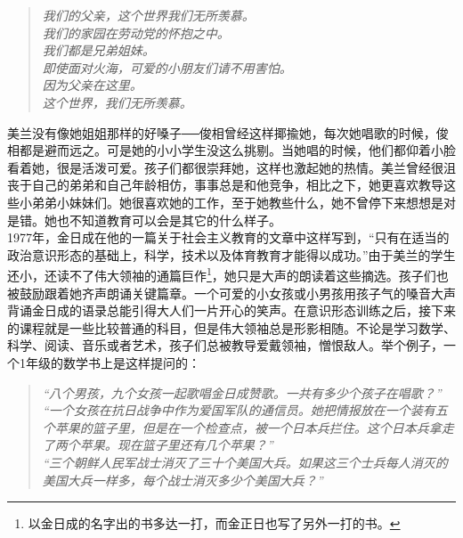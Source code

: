 \begin{quote}
	\begin{spacing}{1.0}  %
		\textit{{\footnotesize 	我们的父亲，这个世界我们无所羡慕。\\
		我们的家园在劳动党的怀抱之中。\\
		我们都是兄弟姐妹。\\
		即使面对火海，可爱的小朋友们请不用害怕。\\
		因为父亲在这里。\\
		这个世界，我们无所羡慕。\\}}
	\end{spacing}
\end{quote}

美兰没有像她姐姐那样的好嗓子──俊相曾经这样揶揄她，每次她唱歌的时候，俊相都是避而远之。可是她的小小学生没这么挑剔。当她唱的时候，他们都仰着小脸看着她，很是活泼可爱。孩子们都很崇拜她，这样也激起她的热情。美兰曾经很沮丧于自己的弟弟和自己年龄相仿，事事总是和他竞争，相比之下，她更喜欢教导这些小弟弟小妹妹们。她很喜欢她的工作，至于她教些什么，她不曾停下来想想是对是错。她也不知道教育可以会是其它的什么样子。\\

1977年，金日成在他的一篇关于社会主义教育的文章中这样写到，“只有在适当的政治意识形态的基础上，科学，技术以及体育教育才能得以成功。”由于美兰的学生还小，还读不了伟大领袖的通篇巨作\footnote{以金日成的名字出的书多达一打，而金正日也写了另外一打的书。}，她只是大声的朗读着这些摘选。孩子们也被鼓励跟着她齐声朗诵关键篇章。一个可爱的小女孩或小男孩用孩子气的嗓音大声背诵金日成的语录总能引得大人们一片开心的笑声。在意识形态训练之后，接下来的课程就是一些比较普通的科目，但是伟大领袖总是形影相随。不论是学习数学、科学、阅读、音乐或者艺术，孩子们总被教导爱戴领袖，憎恨敌人。举个例子，一个1年级的数学书上是这样提问的：\\

\begin{quote}
	\begin{spacing}{1.0}  %
		{\footnotesize 	\textit{“八个男孩，九个女孩一起歌唱金日成赞歌。一共有多少个孩子在唱歌？”}\\

		\textit{“一个女孩在抗日战争中作为爱国军队的通信员。她把情报放在一个装有五个苹果的篮子里，但是在一个检查点，被一个日本兵拦住。这个日本兵拿走了两个苹果。现在篮子里还有几个苹果？”}\\

		\textit{“三个朝鲜人民军战士消灭了三十个美国大兵。如果这三个士兵每人消灭的美国大兵一样多，每个战士消灭多少个美国大兵？”}\\}
	\end{spacing}
\end{quote}

